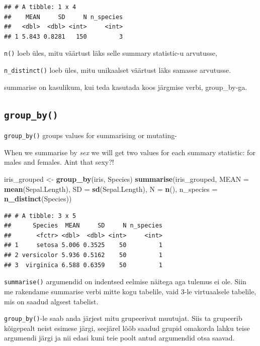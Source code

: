 \documentclass[]{book}
\newenvironment{Shaded}{\begin{snugshade}}{\end{snugshade}}
\newcommand{\KeywordTok}[1]{\textcolor[rgb]{0.13,0.29,0.53}{\textbf{#1}}}
\newcommand{\DataTypeTok}[1]{\textcolor[rgb]{0.13,0.29,0.53}{#1}}
\newcommand{\StringTok}[1]{\textcolor[rgb]{0.31,0.60,0.02}{#1}}
\newcommand{\NormalTok}[1]{#1}
\begin{document}
\begin{verbatim}
## # A tibble: 1 x 4
##    MEAN     SD     N n_species
##   <dbl>  <dbl> <int>     <int>
## 1 5.843 0.8281   150         3
\end{verbatim}

\texttt{n()} loeb üles, mitu väärtust läks selle summary statistic-u
arvutusse,

\texttt{n\_distinct()} loeb üles, mitu unikaalset väärtust läks samasse
arvutusse.

summarise on kasulikum, kui teda kasutada koos järgmise verbi,
group\_by-ga.

\subsection{\texorpdfstring{\texttt{group\_by()}}{group\_by()}}\label{group_by}

\texttt{group\_by()} groups values for summarising or mutating-

When we summarise by \emph{sex} we will get two values for each summary
statistic: for males and females. Aint that sexy?!

\begin{Shaded}
\begin{Highlighting}[]
\NormalTok{iris_grouped <-}\StringTok{ }\KeywordTok{group_by}\NormalTok{(iris, Species) }
\KeywordTok{summarise}\NormalTok{(iris_grouped, }
          \DataTypeTok{MEAN =} \KeywordTok{mean}\NormalTok{(Sepal.Length), }
          \DataTypeTok{SD =} \KeywordTok{sd}\NormalTok{(Sepal.Length), }
          \DataTypeTok{N =} \KeywordTok{n}\NormalTok{(), }
          \DataTypeTok{n_species =} \KeywordTok{n_distinct}\NormalTok{(Species))}
\end{Highlighting}
\end{Shaded}

\begin{verbatim}
## # A tibble: 3 x 5
##      Species  MEAN     SD     N n_species
##       <fctr> <dbl>  <dbl> <int>     <int>
## 1     setosa 5.006 0.3525    50         1
## 2 versicolor 5.936 0.5162    50         1
## 3  virginica 6.588 0.6359    50         1
\end{verbatim}

\texttt{summarise()} argumendid on indentsed eelmise näitega aga tulemus
ei ole. Siin me rakendame summarise verbi mitte kogu tabelile, vaid 3-le
virtuaalsele tabelile, mis on saadud algsest tabelist.

\texttt{group\_by()}-le saab anda järjest mitu grupeerivat muutujat.
Siis ta grupeerib kõigepealt neist esimese järgi, seejärel lõõb saadud
grupid omakorda lahku teise argumendi järgi ja nii edasi kuni teie poolt
antud argumendid otsa saavad.
\end{document}
